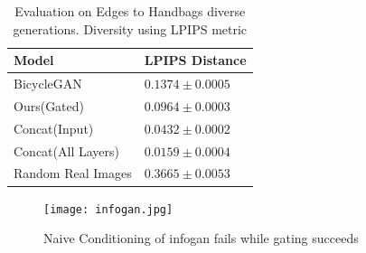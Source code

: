 \begin{table}[ht]
\caption{Evaluation on Edges to Handbags diverse generations. Diversity using LPIPS metric \cite{zhang2018unreasonable}} %
\small
\centering %
\begin{tabular}{p{3cm}p{3cm}} %
\toprule
\textbf{Model} & \textbf{LPIPS Distance} \\%
\midrule
BicycleGAN \cite{zhu2017toward} & $0.1374 \pm 0.0005$  \\ %
\midrule
Ours(Gated) & $0.0964 \pm 0.0003$  \\
\midrule
Concat(Input) &  $0.0432 \pm 0.0002$ \\
\midrule
Concat(All Layers) & $0.0159 \pm 0.0004$ \\
\midrule
Random Real Images & $0.3665 \pm 0.0053$ \\
\bottomrule %
\end{tabular}
\label{table:infogan_lpips} %
\end{table}


\begin{figure}
    \centering
    \texttt{[image: infogan.jpg]}
    \caption{Naive Conditioning of infogan fails while gating succeeds}\label{fig:infogan_gate}
    \vspace{-4mm}
\end{figure}


